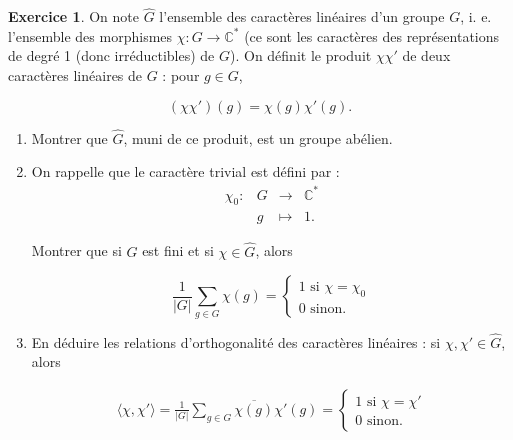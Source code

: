 \documentclass[french]{book}
\theoremstyle{definition}
\newtheorem{exo}{Exercice}
\begin{document}
\begin{exo}
  On note \(\hat{G}\) l'ensemble des caractères linéaires d'un groupe \(G\), i. e. l'ensemble des morphismes \(\chi : G \longrightarrow \mathbb{C} ^{*}\) (ce sont les caractères des représentations de degré 1 (donc irréductibles) de \(G\)). On définit le produit \(\chi\chi'\) de deux caractères linéaires de \(G\) : pour \(g \in G\),

  \[(\chi \chi')(g) = \chi(g)\chi'(g).\]

  \begin{enumerate}
    \item Montrer que \(\hat{G}\), muni  de ce produit, est un groupe abélien.
    \item On rappelle que le caractère trivial  est défini par :
    \[\begin{matrix}
    \chi_0 : & G & \longrightarrow & \mathbb{C} ^{*} \\
    \ & g & \longmapsto & 1.
    \end{matrix}\]

    Montrer que si \(G\) est fini et si \(\chi \in \hat{G}\), alors

    \[\frac{1}{\lvert G \rvert} \sum_{g \in G}^{} \chi(g) = \begin{cases}
      1 \text{ si } \chi = \chi_0 \\
      0 \text{ sinon. }
    \end{cases}\]

    \item En déduire les relations d'orthogonalité des caractères linéaires : si \(\chi, \chi' \in \hat{G}\), alors

    \begin{gather*}
      \langle \chi, \chi' \rangle = \frac{1}{\lvert G \rvert} \sum_{g \in G}^{}  \overline{\chi(g)} \chi'(g) = \begin{cases}
        1 \text{ si } \chi = \chi' \\
        0 \text{ sinon. }
      \end{cases}
    \end{gather*}
  \end{enumerate}

  \end{exo}
\end{document}
